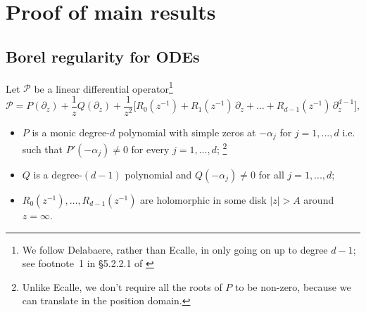 \documentclass{article}
\theoremstyle{definition}
\newcommand{\R}{\mathbb{R}}
\newcommand{\C}{\mathbb{C}}
\newtheorem{remark}[definition]{Remark}
\begin{document}


\section{Proof of main results}
\subsection{Borel regularity for ODEs}\label{borel_reg-ODE}

Let $\mathcal{P}$ be a linear differential operator\footnote{ We follow Delabaere, rather than Ecalle, in only going on up to degree $d-1$; see footnote~1 in \S 5.2.2.1 of \cite{diverg-resurg-iii}}
\begin{equation}
\mathcal{P} = P(\partial_z) + \frac{1}{z} Q(\partial_z) + \frac{1}{z^2}\big[ R_0(z^{-1}) + R_1(z^{-1})\,\partial_z + \ldots + R_{d-1}(z^{-1})\,\partial_z^{d-1} \big],
\end{equation}

\begin{itemize}
\item $P$ is a monic degree-$d$ polynomial with simple zeros at $-\alpha_j$ for $j=1,...,d$ i.e. such that $P'(-\alpha_j)\neq 0$ for every $j=1,...,d$; \footnote{Unlike Ecalle, we don't require all the roots of $P$ to be non-zero, because  we can translate in the position domain.}
\item $Q$ is a degree-$(d-1)$ polynomial and $Q(-\alpha_j)\neq 0$ for all $j=1,...,d$;
\item $R_0(z^{-1}), \ldots, R_{d-1}(z^{-1})$ are holomorphic in some disk $|z| > A$ around $z = \infty$.
\end{itemize}
\end{document}
